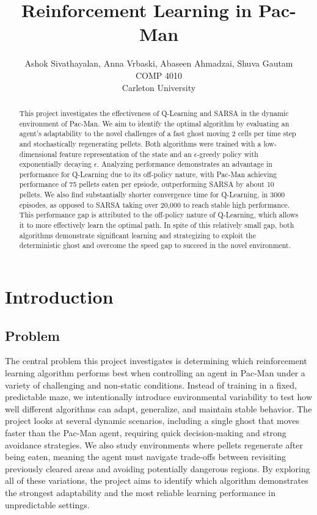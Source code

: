 \documentclass{article}
\title{Reinforcement Learning in Pac-Man}
\author{
Ashok Sivathayalan, Anna Vrbaski, Abaseen Ahmadzai, Shuva Gautam \\
COMP 4010\\
Carleton University \\
}
\begin{document}
\maketitle

\begin{abstract}
This project investigates the effectiveness of Q-Learning and SARSA in the dynamic environment of Pac-Man. We aim to identify the optimal algorithm by evaluating an agent's adaptability to the novel challenges of a fast ghost moving 2 cells per time step and stochastically regenerating pellets. Both algorithms were trained with a low-dimensional feature representation of the state and an $\epsilon$-greedy policy with exponentially decaying $\epsilon$. Analyzing performance demonstrates an advantage in performance for Q-Learning due to its off-policy nature, with Pac-Man achieving performance of 75 pellets eaten per epsiode, outperforming SARSA by about 10 pellets. We also find substantially shorter convergence time for Q-Learning, in 3000 episodes, as opposed to SARSA taking over 20,000 to reach stable high performance. This performance gap is attributed to the off-policy nature of Q-Learning, which allows it to more effectively learn the optimal path. In spite of this relatively small gap, both algorithms demonstrate significant learning and strategizing to exploit the deterministic ghost and overcome the speed gap to succeed in the novel environment. 
\end{abstract}



\section{Introduction}

\subsection{Problem}

The central problem this project investigates is determining which reinforcement learning algorithm performs best when controlling an agent in Pac-Man under a variety of challenging and non-static conditions. Instead of training in a fixed, predictable maze, we intentionally introduce environmental variability to test how well different algorithms can adapt, generalize, and maintain stable behavior. The project looks at several dynamic scenarios, including a single ghost that moves faster than the Pac-Man agent, requiring quick decision-making and strong avoidance strategies. We also study environments where pellets regenerate after being eaten, meaning the agent must navigate trade-offs between revisiting previously cleared areas and avoiding potentially dangerous regions. By exploring all of these variations, the project aims to identify which algorithm demonstrates the strongest adaptability and the most reliable learning performance in unpredictable settings.
\end{document}
